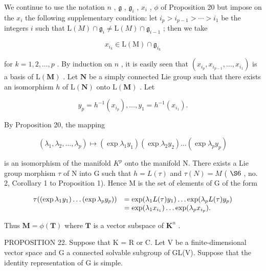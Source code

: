 We continue to use the notation \(n\) , \(\mathfrak{g}\) , \(\mathfrak{g}_{i}\) , \(x_{i}\) , \(\phi\) of Proposition 20 but impose on the \(x_{i}\) the following supplementary condition: let \(i_{p} > i_{p-1} > \cdots > i_{1}\) be the integers \(i\) such that \(\mathrm{L}(M) \cap \mathfrak{g}_{i} \neq \mathrm{L}(M) \cap \mathfrak{g}_{i-1}\) ; then we take

\[
x _ {i _ {k}} \in \mathrm{L} (\mathrm{M}) \cap \mathfrak {g} _ {i _ {k}}
\]

for \(k = 1, 2, \ldots, p\) . By induction on \(n\) , it is easily seen that \((x_{i_p}, x_{i_{p-1}}, \ldots, x_{i_1})\) is a basis of \(\mathrm{L}(\mathbf{M})\) . Let \(\mathbf{N}\) be a simply connected Lie group such that there exists an isomorphism \(h\) of \(\mathrm{L}(\mathbf{N})\) onto \(\mathrm{L}(\mathbf{M})\) . Let

\[
y _ {p} = h ^ {- 1} (x _ {i _ {p}}), \dots , y _ {1} = h ^ {- 1} (x _ {i _ {1}}).
\]

By Proposition 20, the mapping

\[
\left(\lambda_ {1}, \lambda_ {2}, \dots , \lambda_ {p}\right) \mapsto \left(\exp \lambda_ {1} y _ {1}\right) \left(\exp \lambda_ {2} y _ {2}\right) \dots \left(\exp \lambda_ {p} y _ {p}\right)
\]

is an isomorphism of the manifold \(K^{p}\) onto the manifold N. There exists a Lie group morphism \(\tau\) of N into G such that \(h = L(\tau)\) and \(\tau(N) = M\) ( \(\S 6\) , no. 2, Corollary 1 to Proposition 1). Hence M is the set of elements of G of the form

\[
\begin{array}{r l} \tau ((\exp \lambda_ {1} y _ {1}) \dots (\exp \lambda_ {p} y _ {p})) & = \exp (\lambda_ {1} L (\tau) y _ {1}) \dots \exp (\lambda_ {p} L (\tau) y _ {p}) \\ & = \exp (\lambda_ {1} x _ {i _ {1}}) \dots \exp (\lambda_ {p} x _ {i _ {p}}). \end{array}
\]

Thus \(\mathbf{M} = \phi (\mathbf{T})\) where \(\mathbf{T}\) is a vector subspace of \(\mathbf{K}^n\) .

PROPOSITION 22. Suppose that K = R or C. Let V be a finite-dimensional vector space and G a connected solvable subgroup of GL(V). Suppose that the identity representation of G is simple.

